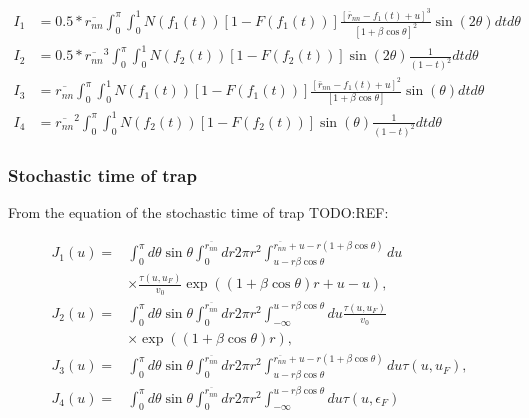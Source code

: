 \begin{equation}
    \begin{aligned}
    I_{1}&=0.5 * \overline{{r}_{n n}} \int_{0}^{\pi} \int_{0}^{1} N\left(f_1\left(t\right)\right)\left[1-F\left(f_1\left(t\right)\right)\right] \frac{\left[\overline{r}_{n n}-f_1\left(t\right)+u\right]^{3}}{[1+\beta \cos \theta]^{2}} \sin (2 \theta) d t d \theta \\
    I_{2}&=0.5 * \overline{r_{n n}}^{3} \int_{0}^{\pi} \int_{0}^{1} N\left(f_2\left(t\right)\right)\left[1-F\left(f_2\left(t\right)\right)\right] \sin (2 \theta) \frac{1}{\left(1-t\right)^{2}} d t d \theta \\
    I_{3}&=\overline{r_{n n}} \int_{0}^{\pi} \int_{0}^{1} N\left(f_1\left(t\right)\right)\left[1-F\left(f_1\left(t\right)\right)\right] \frac{\left[\bar{r}_{n n}-f_1\left(t\right)+u\right]^{2}}{[1+\beta \cos \theta]} \sin (\theta) d t d \theta \\
    I_{4}&=\overline{r_{n n}}^{2} \int_{0}^{\pi} \int_{0}^{1} N\left(f_2\left(t\right)\right)\left[1-F\left(f_2\left(t\right)\right)\right] \sin (\theta) \frac{1}{\left(1-t\right)^{2}} d t d \theta
    \end{aligned}
    \label{eq:2_7}
\end{equation}

\subsubsection{Stochastic time of trap}

From the equation of the stochastic time of trap TODO:REF:

\begin{equation}
    \begin{aligned}
    J_{1}\left(u\right)=& \int_{0}^{\pi} d \theta \sin \theta \int_{0}^{\overline{r_{n n}}} d r 2 \pi r^{2} \int_{u-r \beta \cos \theta}^{\overline{r_{n n}}+u-r(1+\beta \cos \theta)} d u \\
    & \times \frac{\tau\left(u, u_{F}\right)}{v_{0}} \exp \left((1+\beta \cos \theta) r+u-u\right), \\
    J_{2}\left(u\right)=& \int_{0}^{\pi} d \theta \sin \theta \int_{0}^{\overline{r_{n n}}} d r 2 \pi r^{2} \int_{-\infty}^{u-r \beta \cos \theta} d u \frac{\tau\left(u, u_{F}\right)}{v_{0}} \\
    & \times \exp ((1+\beta \cos \theta) r), \\
    J_{3}\left(u\right)=& \int_{0}^{\pi} d \theta \sin \theta \int_{0}^{\overline{r_{n n}}} d r 2 \pi r^{2} \int_{u-r \beta \cos \theta}^{\overline{r_{n n}}+u-r(1+\beta \cos \theta)} d u \tau\left(u, u_{F}\right), \\
    J_{4}\left(u\right)=& \int_{0}^{\pi} d \theta \sin \theta \int_{0}^{\overline{r_{n n}}} d r 2 \pi r^{2} \int_{-\infty}^{u-r \beta \cos \theta} d u \tau\left(u, \epsilon_{F}\right)
    \end{aligned}
\end{equation}

